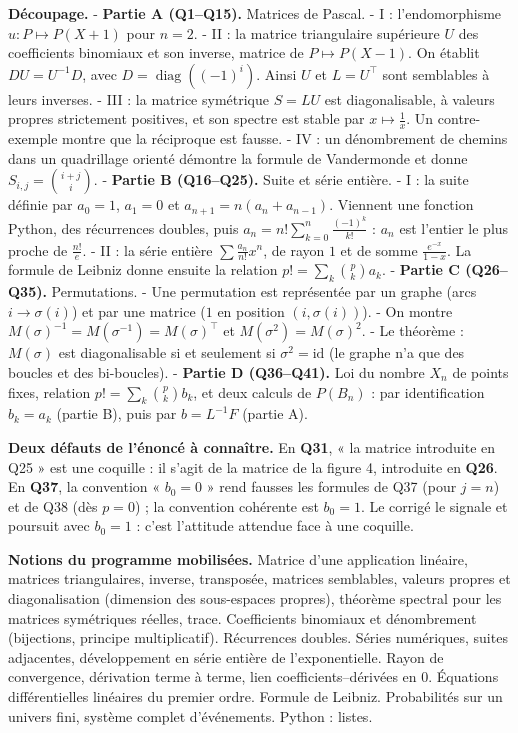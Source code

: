 \documentclass[11pt,a4paper]{article}
\begin{document}
\textbf{Découpage.}
- \textbf{Partie A (Q1--Q15).} Matrices de Pascal.
- I : l'endomorphisme \(u:P\mapsto P(X+1)\) pour \(n=2\).
- II : la matrice triangulaire supérieure \(U\) des coefficients binomiaux et son inverse, matrice de \(P\mapsto P(X-1)\). On établit \(DU=U^{-1}D\), avec \(D=\operatorname{diag}((-1)^i)\). Ainsi \(U\) et \(L=U^\top\) sont semblables à leurs inverses.
- III : la matrice symétrique \(S=LU\) est diagonalisable, à valeurs propres strictement positives, et son spectre est stable par \(x\mapsto\frac1x\). Un contre-exemple montre que la réciproque est fausse.
- IV : un dénombrement de chemins dans un quadrillage orienté démontre la formule de Vandermonde et donne \(S_{i,j}=\binom{i+j}i\).
- \textbf{Partie B (Q16--Q25).} Suite et série entière.
- I : la suite définie par \(a_0=1\), \(a_1=0\) et \(a_{n+1}=n(a_n+a_{n-1})\). Viennent une fonction Python, des récurrences doubles, puis \(a_n=n!\sum_{k=0}^n\frac{(-1)^k}{k!}\) : \(a_n\) est l'entier le plus proche de \(\frac{n!}e\).
- II : la série entière \(\sum\frac{a_n}{n!}x^n\), de rayon \(1\) et de somme \(\frac{e^{-x}}{1-x}\). La formule de Leibniz donne ensuite la relation \(p!=\sum_k\binom pk a_k\).
- \textbf{Partie C (Q26--Q35).} Permutations.
- Une permutation est représentée par un graphe (arcs \(i\to\sigma(i)\)) et par une matrice (\(1\) en position \((i,\sigma(i))\)).
- On montre \(M(\sigma)^{-1}=M(\sigma^{-1})=M(\sigma)^\top\) et \(M(\sigma^2)=M(\sigma)^2\).
- Le théorème : \(M(\sigma)\) est diagonalisable si et seulement si \(\sigma^2=\mathrm{id}\) (le graphe n'a que des boucles et des bi-boucles).
- \textbf{Partie D (Q36--Q41).} Loi du nombre \(X_n\) de points fixes, relation \(p!=\sum_k\binom pk b_k\), et deux calculs de \(P(B_n)\) : par identification \(b_k=a_k\) (partie B), puis par \(b=L^{-1}F\) (partie A).

\textbf{Deux défauts de l'énoncé à connaître.} En \textbf{Q31}, « la matrice introduite en Q25 » est une coquille : il s'agit de la matrice de la figure 4, introduite en \textbf{Q26}. En \textbf{Q37}, la convention « \(b_0=0\) » rend fausses les formules de Q37 (pour \(j=n\)) et de Q38 (dès \(p=0\)) ; la convention cohérente est \textbf{\(b_0=1\)}. Le corrigé le signale et poursuit avec \(b_0=1\) : c'est l'attitude attendue face à une coquille.

\textbf{Notions du programme mobilisées.} Matrice d'une application linéaire, matrices triangulaires, inverse, transposée, matrices semblables, valeurs propres et diagonalisation (dimension des sous-espaces propres), théorème spectral pour les matrices symétriques réelles, trace. Coefficients binomiaux et dénombrement (bijections, principe multiplicatif). Récurrences doubles. Séries numériques, suites adjacentes, développement en série entière de l'exponentielle. Rayon de convergence, dérivation terme à terme, lien coefficients--dérivées en \(0\). Équations différentielles linéaires du premier ordre. Formule de Leibniz. Probabilités sur un univers fini, système complet d'événements. Python : listes.
\end{document}
